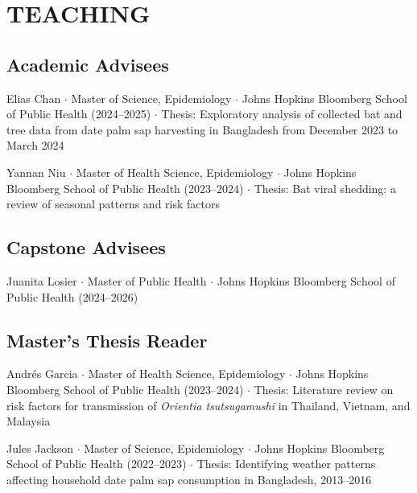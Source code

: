 \documentclass{cv}
\begin{document}

\newpage
{}
\parttwo



\section*{TEACHING}

\subsection*{Academic Advisees}

Elias Chan $\cdot$ Master of Science, Epidemiology $\cdot$ Johns Hopkins Bloomberg School of Public Health (2024--2025) $\cdot$ Thesis: Exploratory analysis of collected bat and tree data from date palm sap harvesting in Bangladesh from December 2023 to March 2024

Yannan Niu $\cdot$ Master of Health Science, Epidemiology $\cdot$ Johns Hopkins Bloomberg School of Public Health (2023--2024) $\cdot$ Thesis: Bat viral shedding: a review of seasonal patterns and risk factors

\subsection*{Capstone Advisees}

Juanita Losier $\cdot$ Master of Public Health $\cdot$ Johns Hopkins Bloomberg School of Public Health (2024--2026)

\subsection*{Master's Thesis Reader}

Andrés Garcia $\cdot$ Master of Health Science, Epidemiology $\cdot$ Johns Hopkins Bloomberg School of Public Health (2023--2024) $\cdot$ Thesis: Literature review on risk factors for transmission of \textit{Orientia tsutsugamushi} in Thailand, Vietnam, and Malaysia

Jules Jackson $\cdot$ Master of Science, Epidemiology $\cdot$ Johns Hopkins Bloomberg School of Public Health (2022--2023) $\cdot$ Thesis: Identifying weather patterns affecting household date palm sap consumption in Bangladesh, 2013--2016
\end{document}
